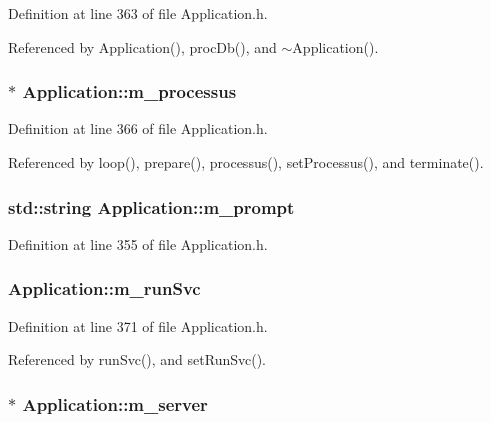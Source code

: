 Definition at line 363 of file Application.h.

Referenced by Application(), procDb(), and $\sim$Application().\hypertarget{classApplication_ab5eb4b3d3bef5ab9fce9c69401ce5786}{
\subsubsection[{m\_\-processus}]{$\ast$ {\bf Application::m\_\-processus}}}
\label{classApplication_ab5eb4b3d3bef5ab9fce9c69401ce5786}


Definition at line 366 of file Application.h.

Referenced by loop(), prepare(), processus(), setProcessus(), and terminate().\hypertarget{classApplication_a84f3f07f42ad77ad46cc8ef42d609948}{
\subsubsection[{m\_\-prompt}]{\setlength{\rightskip}{0pt plus 5cm}std::string {\bf Application::m\_\-prompt}}}
\label{classApplication_a84f3f07f42ad77ad46cc8ef42d609948}


Definition at line 355 of file Application.h.\hypertarget{classApplication_ad2c061af424280151c86b9b56d9724d3}{
\subsubsection[{m\_\-runSvc}]{ {\bf Application::m\_\-runSvc}}}
\label{classApplication_ad2c061af424280151c86b9b56d9724d3}


Definition at line 371 of file Application.h.

Referenced by runSvc(), and setRunSvc().\hypertarget{classApplication_a5e6085b0f322d5036177b16113a75b56}{
\subsubsection[{m\_\-server}]{$\ast$ {\bf Application::m\_\-server}}}
\label{classApplication_a5e6085b0f322d5036177b16113a75b56}


